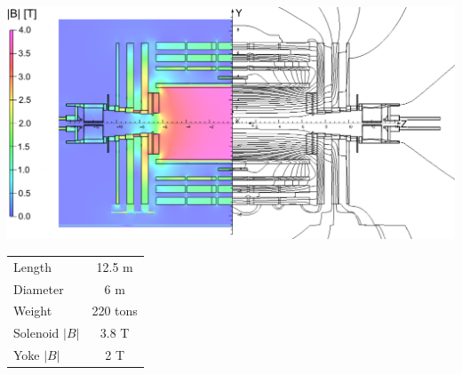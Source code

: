 \begin{minipage}{\linewidth} 
    \vspace{0.5cm}
    \begin{minipage}{0.65\linewidth}
        \centering
        \includegraphics[width=1\linewidth]{fig//chap03-cms/magnetic_field.png}
        \label{fig:magnetic_field}
    \end{minipage}
    \hfill
    \begin{minipage}{0.3\linewidth}
        \centering
        \begin{tabular}{l|c}
            \hline
            Length &  12.5 m\\
            Diameter & 6 m\\
            Weight &  220 tons\\
            Solenoid $|B|$ &  3.8 T\\
            Yoke $|B|$ & 2 T\\
            \hline
        \end{tabular}
        \vspace{0.4cm}
    \end{minipage}
\end{minipage}

